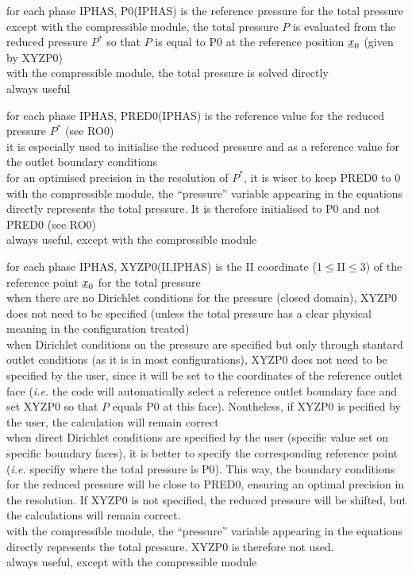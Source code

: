 {for each phase IPHAS, P0(IPHAS) is the reference pressure for the total
pressure\\
except with the compressible module, the total pressure $P$ is evaluated
from the reduced pressure $P^*$ so that $P$
is equal to P0 at the reference position $\underline{x}_0$ (given by XYZP0)\\
with the compressible module, the total pressure is solved directly\\
always useful}

{for each phase IPHAS, PRED0(IPHAS) is the reference value for the reduced
pressure $P^*$ (see RO0)\\
it is especially used to initialise the reduced pressure and as a reference
value for the outlet boundary conditions\\
for an optimised precision in the resolution of $P^*$, it is wiser to keep PRED0
to 0\\
with the compressible module, the ``pressure'' variable appearing in the
equations directly represents the total pressure. It is therefore initialised
to P0 and not PRED0 (see RO0)\\
always useful, except with the compressible module}

{for each phase IPHAS, XYZP0(II,IPHAS) is the II coordinate
(1$\leqslant$II$\leqslant$3) of the reference point $\underline{x}_0$ for the
total pressure\\
when there are no Dirichlet conditions for the pressure (closed domain), XYZP0
does not need to be specified (unless the total pressure has a clear physical
meaning in the configuration treated)\\
when Dirichlet conditions on the pressure are specified but only through stantard
outlet conditions (as it is in most configurations),
XYZP0 does not need to be specified by the user, since it will be set to the
coordinates of the reference outlet face ({\em i.e.} the code will automatically
select a
reference outlet boundary face and set XYZP0 so that $P$ equals P0 at this
face). Nontheless, if XYZP0 is pecified by the user, the calculation will remain
correct\\
when direct Dirichlet conditions are specified by the user (specific value set
on specific boundary faces), it is better to specify the corresponding reference
point ({\em i.e.} specifiy where the total pressure is P0). This way, the
boundary conditions for the reduced pressure will be close to PRED0, ensuring an
optimal precision in the resolution. If XYZP0 is not specified, the reduced
pressure will be shifted, but the calculations will remain correct.\\
with the compressible module, the ``pressure'' variable appearing in the
equations directly represents the total pressure. XYZP0 is therefore not used.\\
always useful, except with the compressible module}

